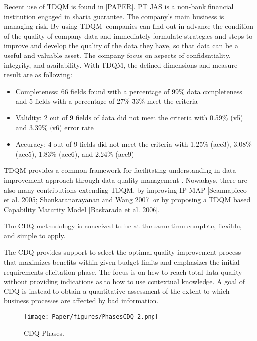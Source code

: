 \documentclass[pdftex,english,oribibl]{llncs}
\begin{document}
Recent use of TDQM is found in [PAPER]. PT JAS is a non-bank financial institution engaged in sharia guarantee. The company's main business is managing risk. By using TDQM, companies can find out in advance the condition of the quality of company data and immediately formulate strategies and steps to improve and develop the quality of the data they have, so that data can be a useful and valuable asset. The company focus on aspects of confidentiality, integrity, and availability. With TDQM, the defined dimensions and measure result are as following:
\begin{itemize}
    \item Completeness: 66 fields found with a percentage of 99\% data completeness and 5 fields with a percentage of 27\% \~ 33\% meet the criteria
    \item Validity: 2 out of 9 fields of data did not meet the criteria with 0.59\% (v5) and 3.39\% (v6) error rate
    \item Accuracy: 4 out of 9 fields did not meet the criteria with  1.25\% (acc3), 3.08\% (acc5), 1.83\% (acc6), and 2.24\% (acc9)

\end{itemize}
TDQM provides a common framework for facilitating understanding in data improvement approach through data quality management .
Nowadays, there are also many contributions extending TDQM, by improving IP-MAP [Scannapieco et al. 2005; Shankaranarayanan and Wang 2007] or by proposing a TDQM based Capability Maturity Model [Baskarada et al. 2006].




The CDQ methodology \cite{Batini2006DQConceptsMethodologiesTechniques} \cite{Batini2007ComprehensiveDQ} \cite{Batini2008ComprehensiveDQ} is conceived to be at the same time complete, flexible, and simple to apply.

The CDQ provides support to select the optimal quality improvement process that maximizes benefits within given budget limits and emphasizes the initial requirements elicitation phase.
The focus is on how to reach total data quality without providing indications as to how to use contextual knowledge. A goal of CDQ is instead to obtain a quantitative assessment of the extent to which business processes are affected by bad information.

\begin{figure}
    \centering
    \texttt{[image: Paper/figures/PhasesCDQ-2.png]}
    \caption{CDQ Phases.}
    \label{fig:PhasesCDQ}
 \end{figure}
\end{document}
